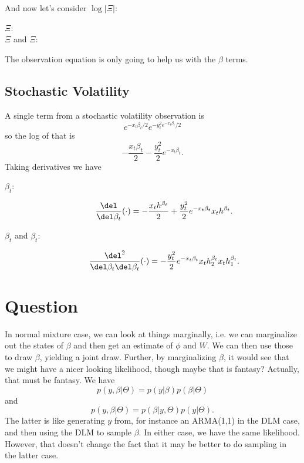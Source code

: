 \documentclass{article}
\begin{document}
And now let's consider $\log |\Xi|$:
\begin{description}

\item[$\Xi$:]

\item[$\Xi$ and $\Xi$:]

\end{description}

The observation equation is only going to help us with the $\beta$ terms.

\subsection{Stochastic Volatility}

A single term from a stochastic volatility observation is
\[
e^{-x_t \beta_t/2} e^{-y_t^2 e^{-x_t \beta_t} / 2}
\]
so the log of that is
\[
- \frac{x_t \beta_t}{2} - \frac{y_t^2}{2} e^{-x_t \beta_t}.
\]
Taking derivatives we have
\begin{description}

\item[$\beta_t$:] \hfill
\[
\frac{\del}{\del \beta_{t}}(\cdot) = - \frac{x_t h^{\beta_t}}{2} 
+ \frac{y_t^2}{2} e^{-x_t \beta_t} x_t h^{\beta_t}.
\]

\item[$\beta_t$ and $\beta_t$:]
\[
\frac{\del^2}{\del \beta_t \del \beta_{t}}(\cdot) = 
-\frac{y_t^2}{2} e^{-x_t \beta_t} x_t h^{\beta_t}_2 x_t h^{\beta_t}_1.
\]

\end{description}

\section{Question}

In normal mixture case, we can look at things marginally, i.e. we can
marginalize out the states of $\beta$ and then get an estimate of $\phi$ and
$W$.  We can then use those to draw $\beta$, yielding a joint draw.  Further, by
marginalizing $\beta$, it would see that we might have a nicer looking
likelihood, though maybe that is fantasy?  Actually, that must be fantasy.  We
have
\[
p(y, \beta | \Theta) = p(y | \beta) p(\beta | \Theta)
\]
and
\[
p(y, \beta | \Theta) = p(\beta | y, \Theta) p(y | \Theta).
\]
The latter is like generating $y$ from, for instance an ARMA(1,1) in the DLM
case, and then using the DLM to sample $\beta$.  In either case, we have the
same likelihood.  However, that doesn't change the fact that it may be better to
do sampling in the latter case.

{}

\end{document}
